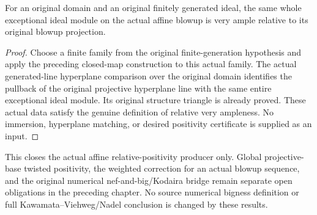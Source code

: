\begin{lemma}
\label{lem:kn-nadel-nef-big-exceptional-relative-very-ample}

For an original domain and an original finitely generated ideal, the same
whole exceptional ideal module on the actual affine blowup is very ample
relative to its original blowup projection.
\end{lemma}
\begin{proof}
Choose a finite family from the original finite-generation hypothesis and
apply the preceding closed-map construction to this actual family. The
actual generated-line hyperplane comparison over the original domain
identifies the pullback of the original projective hyperplane line with
the same entire exceptional ideal module. Its original structure triangle
is already proved. These actual data satisfy the genuine definition of
relative very ampleness. No immersion, hyperplane matching, or desired
positivity certificate is supplied as an input.
\end{proof}

This closes the actual affine relative-positivity producer only. Global
projective-base twisted positivity, the weighted correction for an actual
blowup sequence, and the original numerical nef-and-big/Kodaira bridge
remain separate open obligations in the preceding chapter. No source
numerical bigness definition or full Kawamata--Viehweg/Nadel conclusion
is changed by these results.
